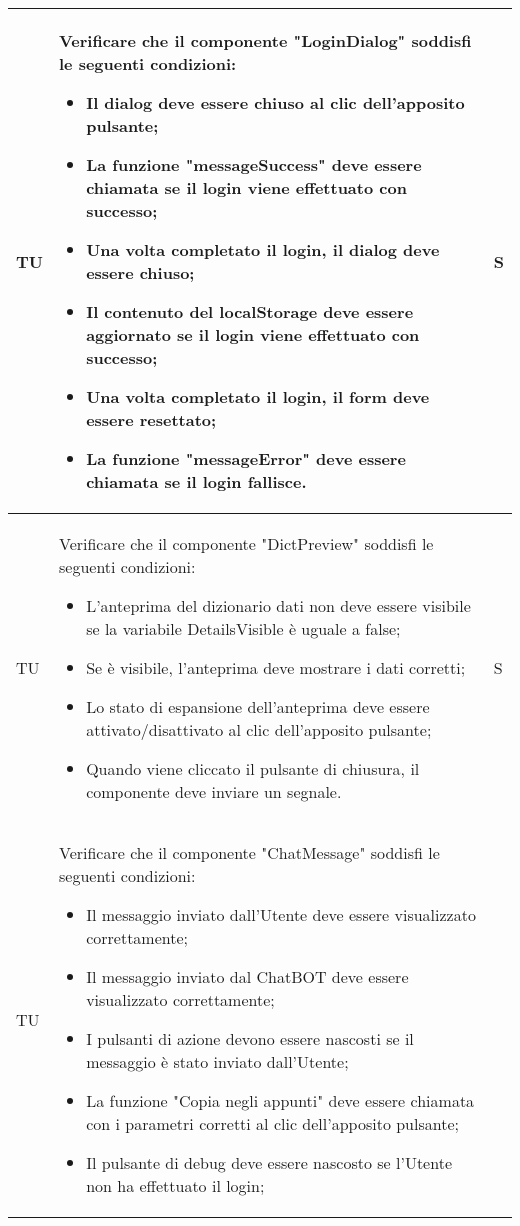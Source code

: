 \begin{adjustwidth}{-0.5cm}{-0.5cm}
\begin{longtable}{|P{1.5cm}|>{\raggedright}P{9.5cm}|>{\arraybackslash}P{1.5cm}|}
		\hline TU & Verificare che il componente "LoginDialog" soddisfi le seguenti condizioni:
    \begin{itemize}
      \item Il dialog deve essere chiuso al clic dell'apposito pulsante;
			\item La funzione "messageSuccess" deve essere chiamata se il login viene effettuato con successo;
			\item Una volta completato il login, il dialog deve essere chiuso;
			\item Il contenuto del localStorage deve essere aggiornato se il login viene effettuato con successo;
			\item Una volta completato il login, il form deve essere resettato;
			\item La funzione "messageError" deve essere chiamata se il login fallisce.
    \end{itemize} & S \\
		\hline TU & Verificare che il componente "DictPreview" soddisfi le seguenti condizioni:
    \begin{itemize}
      \item L'anteprima del dizionario dati non deve essere visibile se la variabile DetailsVisible è uguale a false;
			\item Se è visibile, l'anteprima deve mostrare i dati corretti;
			\item Lo stato di espansione dell'anteprima deve essere attivato/disattivato al clic dell'apposito pulsante;
			\item Quando viene cliccato il pulsante di chiusura, il componente deve inviare un segnale.
    \end{itemize} & S \\
		\hline TU & Verificare che il componente "ChatMessage" soddisfi le seguenti condizioni:
    \begin{itemize}
      \item Il messaggio inviato dall'Utente deve essere visualizzato correttamente;
			\item Il messaggio inviato dal ChatBOT deve essere visualizzato correttamente;
			\item I pulsanti di azione devono essere nascosti se il messaggio è stato inviato dall'Utente;
			\item La funzione "Copia negli appunti" deve essere chiamata con i parametri corretti al clic dell'apposito pulsante;
			\item Il pulsante di debug deve essere nascosto se l'Utente non ha effettuato il login;

\end{itemize}
\end{longtable}
\end{adjustwidth}
